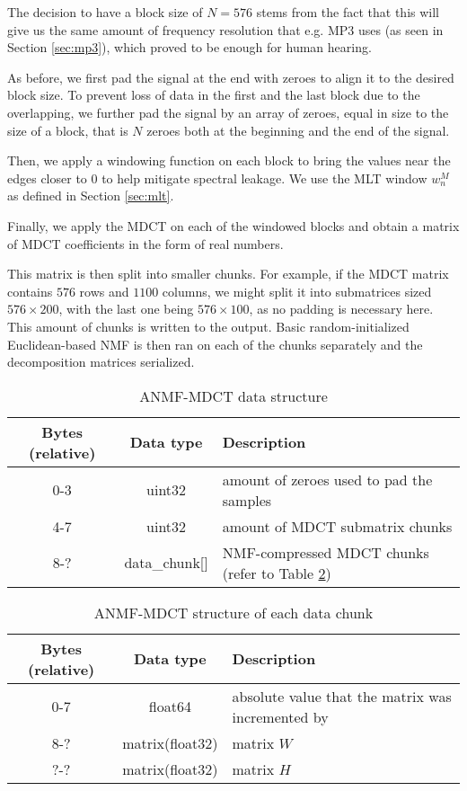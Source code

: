 The decision to have a block size of $N = 576$ stems from the fact that this will give us the same amount of frequency resolution that e.g. MP3 uses (as seen in Section \ref{sec:mp3}), which proved to be enough for human hearing.

As before, we first pad the signal at the end with zeroes to align it to the desired block size. To prevent loss of data in the first and the last block due to the overlapping, we further pad the signal by an array of zeroes, equal in size to the size of a block, that is $N$ zeroes both at the beginning and the end of the signal.

Then, we apply a windowing function on each block to bring the values near the edges closer to $0$ to help mitigate spectral leakage. We use the MLT window $w_n^M$ as defined in Section \ref{sec:mlt}.

Finally, we apply the MDCT on each of the windowed blocks and obtain a matrix of MDCT coefficients in the form of real numbers.

This matrix is then split into smaller chunks. For example, if the MDCT matrix contains $576$ rows and $1100$ columns, we might split it into submatrices sized $576 \times 200$, with the last one being $576 \times 100$, as no padding is necessary here. This amount of chunks is written to the output. Basic random-initialized Euclidean-based NMF is then ran on each of the chunks separately and the decomposition matrices serialized.

\begin{table}[htbp]\caption{ANMF-MDCT data structure}
	\label{tab:anmf_mdct_file}
	\centering
	\begin{tabular}{|c|c|l|}
		\hline
		Bytes (relative) & Data type & Description \\ \hline
		0-3 & uint32 & amount of zeroes used to pad the samples \\
		4-7 & uint32 & amount of MDCT submatrix chunks \\
		8-? & data\_chunk[] & NMF-compressed MDCT chunks (refer to Table \ref{tab:anmf_mdct_data}) \\
		\hline
	\end{tabular}
\end{table}

\begin{table}[htbp]\caption{ANMF-MDCT structure of each data chunk}
	\label{tab:anmf_mdct_data}
	\centering
	\begin{tabular}{|c|c|l|}
		\hline
		Bytes (relative) & Data type & Description \\ \hline
		0-7 & float64 & absolute value that the matrix was incremented by \\
		8-? & matrix(float32) & matrix $W$ \\
		?-? & matrix(float32) & matrix $H$ \\
		\hline
	\end{tabular}
\end{table}

